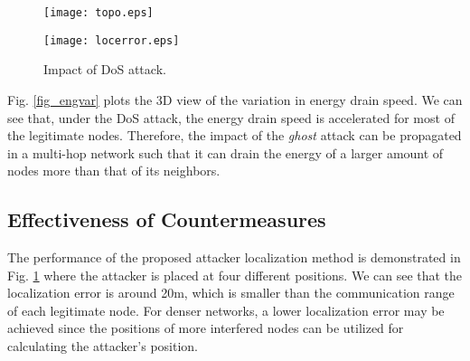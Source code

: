 \documentclass[10pt,journal,cspaper,compsoc]{IEEEtran}
\begin{document}
\begin{figure}[!ht]
\hspace{-4.5mm}
\centering
\begin{minipage}{.22\textwidth}
  \centering
        \texttt{[image: topo.eps]}
  \vspace{-4mm}
  \label{fig_top}
\end{minipage}\hspace{5mm}
\begin{minipage}{.22\textwidth}
  \centering
    	\texttt{[image: locerror.eps]}
  \vspace{-4mm}
  \label{fig_locerror}
\end{minipage}
\end{figure}


\begin{figure}[!ht]
\vspace{-3mm}
	\centering
    \vspace{-2mm}
	\caption{Impact of DoS attack.}	
	\label{Fig_dos}
    \vspace{-2mm}
\end{figure}

Fig. \ref{fig_engvar} plots the 3D view of the variation in energy drain speed. We can see that, under the DoS attack, the energy drain speed is accelerated for most of the legitimate nodes. Therefore, the impact of the {\em ghost} attack can be propagated in a multi-hop network such that it can drain the energy of a larger amount of nodes more than that of its neighbors.


\subsection{Effectiveness of Countermeasures}
The performance of the proposed attacker localization method is demonstrated in Fig. \ref{fig_locerror} where the attacker is placed at four different positions. We can see that the localization error is around 20m, which is smaller than the communication range of each legitimate node. For denser networks, a lower localization error may be achieved since the positions of more interfered nodes can be utilized for calculating the attacker's position.
\end{document}
